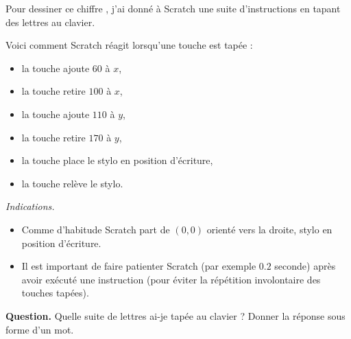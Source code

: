 \documentclass[class=report,crop=false, 12pt]{standalone}
\begin{document}
\begin{enigme}

Pour dessiner ce chiffre  \fg{}, j'ai donné à Scratch une suite d'instructions en tapant des lettres au clavier.


Voici comment Scratch réagit lorsqu'une touche est tapée : 
\begin{itemize}
  \item la touche  ajoute $60$ à $x$,
  \item la touche  retire $100$ à $x$,
  \item la touche  ajoute $110$ à $y$,
  \item la touche  retire $170$ à $y$,  
  \item la touche  place le stylo en position d'écriture,
  \item la touche  relève le stylo.  
\end{itemize}

\bigskip

\emph{Indications.}
\begin{itemize}
  \item Comme d'habitude Scratch part de $(0,0)$ orienté vers la droite, stylo en position d'écriture.
  
  \item Il est important de faire patienter Scratch (par exemple $0.2$ seconde) après avoir exécuté une instruction
  (pour éviter la répétition involontaire des touches tapées).
   
\end{itemize}

\bigskip

\textbf{Question.} Quelle suite de lettres ai-je tapée au clavier ?
Donner la réponse sous forme d'un mot.



\end{enigme}
\end{document}
